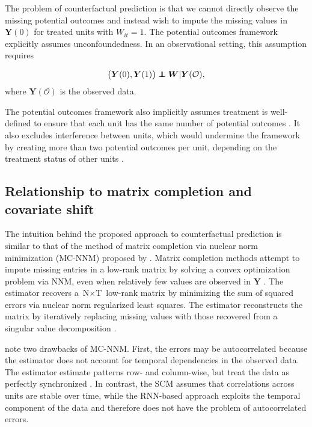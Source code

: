 The problem of counterfactual prediction is that we cannot directly observe the missing potential outcomes and instead wish to impute the missing values in $\boldsymbol{Y}(0)$ for treated units with $W_{it} =1$.  The potential outcomes framework explicitly assumes unconfoundedness. In an observational setting, this assumption requires

$$
\left(\boldsymbol{Y}(0), \boldsymbol{Y}(1) \right) \independent \boldsymbol{W}| \boldsymbol{Y}(\mathcal{O}),
$$ where $\boldsymbol{Y}(\mathcal{O})$ is the observed data. 

The potential outcomes framework also implicitly assumes treatment is well-defined to ensure that each unit has the same number of potential outcomes \citep{imbens2015causal}. It also excludes interference between units, which would undermine the framework by creating more than two potential outcomes per unit, depending on the treatment status of other units \citep{rubin1990}.

\subsection{Relationship to matrix completion and covariate shift}

The intuition behind the proposed approach to counterfactual prediction is similar to that of the method of matrix completion via nuclear norm minimization (MC-NNM) proposed by \citet{athey2017matrix}. Matrix completion methods attempt to impute missing entries in a low-rank matrix by solving a convex optimization problem via NNM, even when relatively few values are observed in $\boldsymbol{Y}$ \citep{candes2009exact,candes2010matrix}. The estimator recovers a $\text{N} \times \text{T}$ low-rank matrix by minimizing the sum of squared errors via nuclear norm regularized least squares. The estimator reconstructs the matrix by iteratively replacing missing values with those recovered from a singular value decomposition \citep{mazumder2010spectral}. 

\citet{athey2017matrix} note two drawbacks of MC-NNM. First, the errors may be autocorrelated because the estimator does not account for temporal dependencies in the observed data. The estimator estimate patterns row- and column-wise, but treat the data as perfectly synchronized \citep{yoon2018estimating}. In contrast, the SCM assumes that correlations across units are stable over time, while the RNN-based approach exploits the temporal component of the data and therefore does not have the problem of autocorrelated errors. 


